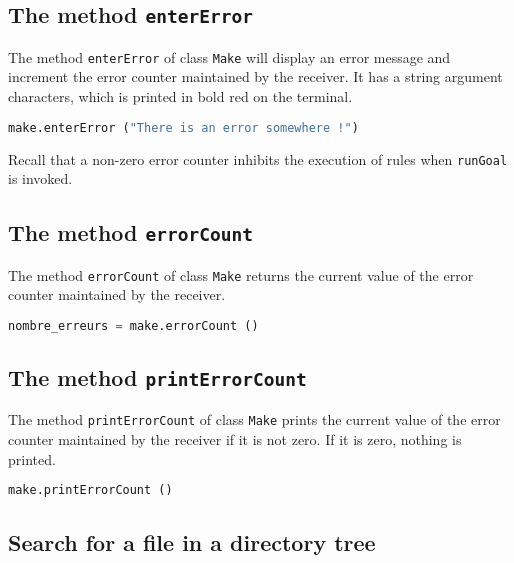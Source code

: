 \documentclass[a4paper,11pt]{extarticle}
\begin{document}
\subsection{The method \texttt{enterError}}

The method \texttt{enterError} of class \texttt{Make} will display an error message and increment the error counter maintained by the receiver. It has a string argument characters, which is printed in bold red on the terminal.
\begin{lstlisting}[language=py]
make.enterError ("There is an error somewhere !")
\end{lstlisting}
Recall that a non-zero error counter inhibits the execution of rules when \texttt{runGoal}  is invoked.

\subsection{The method \texttt{errorCount}}

The method \texttt{errorCount} of class \texttt{Make} returns the current value of the error counter maintained by the receiver.
\begin{lstlisting}[language=py]
nombre_erreurs = make.errorCount ()
\end{lstlisting}


\subsection{The method \texttt{printErrorCount}}

The method \texttt{printErrorCount}  of class \texttt{Make} prints the current value of the error counter maintained by the receiver if it is not zero. If it is zero, nothing is printed.
\begin{lstlisting}[language=py]
make.printErrorCount ()
\end{lstlisting}


\subsection{Search for a file in a directory tree}
\end{document}

